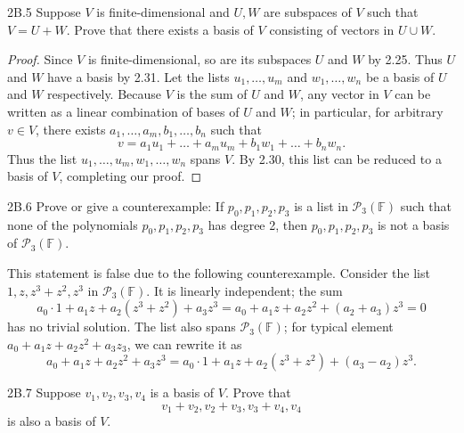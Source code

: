 \documentclass{exam}
\begin{document}
\begin{problem}{2B.5}
    Suppose $V$ is finite-dimensional and $U, W$ are subspaces of $V$ such that $V = U + W$. Prove that there exists a basis of $V$ consisting of vectors in $U\cup W$.
\end{problem}

\begin{proof}
    Since $V$ is finite-dimensional, so are its subspaces $U$ and $W$ by 2.25. Thus $U$ and $W$ have a basis by 2.31. Let the lists $u_1, \dots, u_m$ and $w_1, \dots, w_n$ be a basis of $U$ and $W$ respectively. Because $V$ is the sum of $U$ and $W$, any vector in $V$ can be written as a linear combination of bases of $U$ and $W$; in particular, for arbitrary $v\in V$, there exists $a_1, \dots, a_m, b_1, \dots, b_n$ such that \[
        v = a_1u_1 + \dots + a_mu_m + b_1w_1 + \dots + b_nw_n.
    \]
    Thus the list $u_1, \dots, u_m, w_1, \dots, w_n$ spans $V$. By 2.30, this list can be reduced to a basis of $V$, completing our proof.
\end{proof}

\begin{problem}{2B.6}
    Prove or give a counterexample: If $p_0,p_1,p_2,p_3$ is a list in $\mathcal P_3(\mathbb F)$ such that none of the polynomials $p_0, p_1, p_2, p_3$ has degree 2, then $p_0, p_1, p_2, p_3$ is not a basis of $\mathcal P_3(\mathbb F)$.
\end{problem}

This statement is false due to the following counterexample. Consider the list $1, z, z^3 + z^2, z^3$ in $\mathcal P_3(\mathbb F)$. It is linearly independent; the sum \[
    a_0\cdot1 + a_1z + a_2(z^3 + z^2) + a_3z^3 = a_0 + a_1z + a_2z^2 + (a_2 + a_3)z^3 = 0
\]
has no trivial solution. The list also spans $\mathcal P_3(\mathbb F)$; for typical element $a_0 + a_1z + a_2z^2 + a_3z_3$, we can rewrite it as \[
    a_0 + a_1z + a_2z^2 + a_3z^3 = a_0\cdot1 + a_1z + a_2(z^3 + z^2) + (a_3-a_2)z^3.
\]

\begin{problem}{2B.7}
    Suppose $v_1,v_2,v_3,v_4$ is a basis of $V$. Prove that \[
        v_1 + v_2, v_2 + v_3, v_3 + v_4, v_4
    \]
    is also a basis of $V$.
\end{problem}
\end{document}
